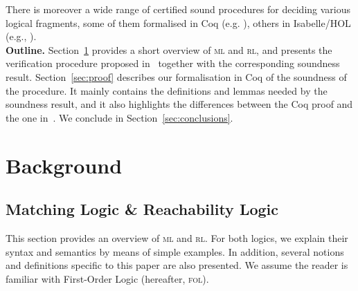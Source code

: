 \documentclass[conference]{IEEEtran}
\newenvironment{todo}{\medskip\hrule\smallskip\noindent}{\smallskip\hrule\medskip}
\newcommand{\dl}[1]{\begin{todo}\textcolor{blue}{Dorel:}\\ \color{red}{#1}\color{black}\end{todo}}
\newcommand{\dl}[1]{}
\newcommand{\ML}{\textsc{ml}\xspace}
\newcommand{\FOL}{\textsc{fol}\xspace}
\newcommand{\RL}{\textsc{rl}\xspace}
\begin{document}
There is moreover a wide range of certified sound procedures for deciding various logical fragments, some of them formalised in Coq (e.g. \cite{DBLP:journals/corr/abs-1105-4537, DBLP:conf/types/Besson06}), others in Isabelle/HOL (e.g., \cite{ChaiebN-LPAR05}).\\

{\bf Outline.} 
Section~\ref{sec:background} provides a short overview of \ML and \RL, and presents the verification procedure proposed in~\cite{lucanu-rusu-arusoaie-nowak-LRC2015} together with the corresponding soundness result.
Section~\ref{sec:proof} describes our formalisation in Coq of the soundness of the procedure.
It mainly contains the definitions and lemmas needed by the soundness result, and it also highlights the differences between the Coq proof and the one in~\cite{lucanu-rusu-arusoaie-nowak-LRC2015}.
We conclude in Section~\ref{sec:conclusions}.




\section{Background}
\label{sec:background}
\subsection{Matching Logic \& Reachability Logic}
\label{sec:intro}
This section provides an overview of \ML and \RL.
For both logics, we explain their syntax and semantics by means of simple examples. 
In addition, several notions and definitions specific to this paper are also presented.
We assume the reader is familiar with First-Order Logic (hereafter, \FOL).
\end{document}
